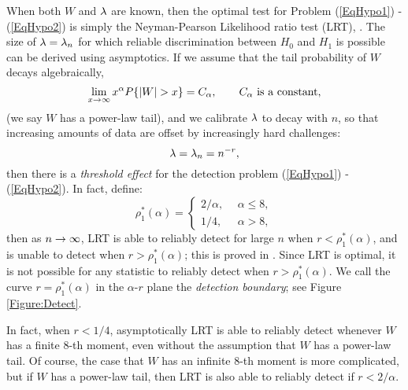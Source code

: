 When both $W$ and $\lambda$ are known, then the optimal test for Problem (\ref{EqHypo1}) - (\ref{EqHypo2}) is simply 
the Neyman-Pearson Likelihood ratio test (LRT), \cite[Page 74 ]{Lehmann}. The size of $\lambda = \lambda_n$  for which 
reliable discrimination between $H_0$ and $H_1$ is possible can be derived using asymptotics. If we assume that 
the tail probability of $W$ decays algebraically, 
\begin{equation} \label{EqDefineAlg}
\lim_{x \rightarrow \infty}   x^{\alpha}  P\{|W| > x\}  = C_{\alpha},  \qquad \mbox{$C_{\alpha}$ is a constant},
\end{equation}
(we say $W$ has a power-law tail), and we calibrate $\lambda$ to decay with $n$, so that increasing amounts of data are offset by increasingly hard challenges: 
\begin{equation}   \label{EqDefineLam}
\lambda = \lambda_n  = n^{-r},  
\end{equation}
then there is a {\it threshold effect} for the detection problem (\ref{EqHypo1}) - (\ref{EqHypo2}). In fact, define:
\begin{equation} \label{EqDetectBoundary}
\rho^*_1(\alpha) = 
\left\{ \begin{array}{ll}
2/\alpha, &\   \  \alpha \leq 8,\\
1/4, &\     \       \alpha > 8,
\end{array}
\right.
\end{equation}
then as $n \rightarrow \infty$, LRT is able to reliably detect for large $n$ when $r < \rho^*_1(\alpha)$, and is unable to detect 
when $r > \rho^*_1(\alpha)$; this is proved in \cite{DJ04b}. Since LRT is optimal, it is not possible for any statistic to 
reliably detect when $r > \rho^*_1(\alpha)$. We call the curve $r = \rho^*_1(\alpha)$ in the $\alpha$-$r$ plane the 
{\it detection boundary}; see Figure \ref{Figure:Detect}. 

In fact, when $r < 1/4$, asymptotically LRT is able to reliably detect whenever $W$ has a finite $8$-th moment, even without 
the assumption that $W$ has a power-law tail. Of course, the case that $W$ has an infinite $8$-th moment is more complicated, 
but if $W$ has a power-law tail, then LRT is also able to reliably detect if $r < 2/\alpha$. 


